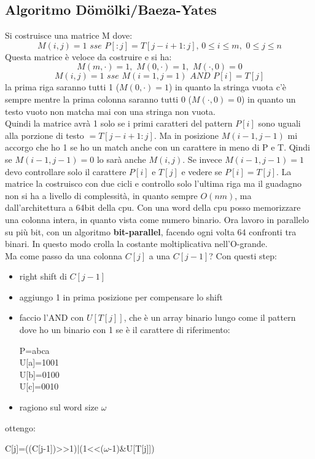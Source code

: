 \documentclass[a4paper,12pt, oneside]{book}
\begin{document}
\subsection{Algoritmo D\"om\"olki/Baeza-Yates}
Si costruisce una matrice M dove:
\[M(i,j)=1\,\,sse\,\,P[:j]=T[j-i+1:j],\,0\leq i\leq m,\,\,0\leq j\leq n\]
Questa matrice è veloce da costruire e si ha:
\[M(m,\cdot) = 1,\,\, M(0,\cdot)=1,\,\, M(\cdot, 0)=0\]
\[M(i,j)=1\,\,sse\,\,M(i=1, j=1)\,\,AND\,\, P[i]=T[j]\]
la prima riga saranno tutti 1 ($ M(0,\cdot)=1$) in quanto la stringa
vuota c'è sempre mentre la prima colonna saranno tutti 0 ($M(\cdot,
0)=0$) in quanto un testo vuoto non matcha mai con una stringa non
vuota.\\
Quindi la matrice avrà 1 solo se i primi caratteri del pattern $P[i]$ sono
uguali alla porzione di testo $=T[j-i+1:j]$. Ma in posizione $M(i-1,
j-1)$ mi accorgo che ho 1 se ho un match anche con un carattere in
meno di P e T. Qindi se $M(i-1,j-1)=0$ lo sarà anche $M(i,j)$. Se
invece $M(i-1,j-1)=1$ devo controllare solo il carattere $P[i]$ e
$T[j]$ e vedere se $ P[i]=T[j]$. La matrice la costruisco con due
cicli e controllo solo l'ultima riga ma il guadagno non si ha a livello di
complessità, in quanto sempre $O(nm)$, ma dall'architettura a 64bit
della cpu. Con una word della cpu posso memorizzare una colonna
intera, in quanto vista come numero binario. Ora lavoro in parallelo
su più bit, con un algoritmo \textbf{bit-parallel}, facendo ogni volta
64 confronti tra binari. In questo modo crolla la costante
moltiplicativa nell'O-grande.\\
Ma come passo da una colonna $C[j]$ a una $C[j-1]$? Con questi step:
\begin{itemize}
  \item right shift di $C[j-1]$
  \item aggiungo 1 in prima posizione per compensare lo shift
  \item faccio l'AND con $U[T[j]]$, che è un array binario lungo come
  il pattern dove ho un binario con 1 se è il carattere  di
  riferimento:
  \begin{center}
    P=abca\\
    U[a]=1001\\
    U[b]=0100\\
    U[c]=0010\\
  \end{center}
  \item ragiono sul word size $\omega$
\end{itemize}
ottengo:
\begin{center}
 C[j]=((C[j-1])>>1)|(1<<($\omega$-1)\&U[T[j]])
\end{center}
\end{document}
